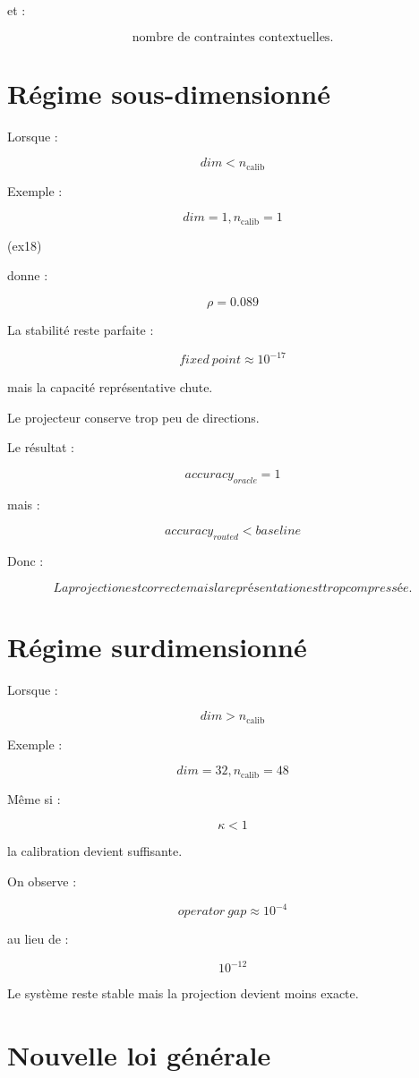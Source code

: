 \documentclass[11pt]{article}
\begin{document}
et :

\[
\text{nombre de contraintes contextuelles}.
\]


\section{Régime sous-dimensionné}


Lorsque :

\[
dim<n_{\mathrm{calib}}
\]


Exemple :

\[
dim=1,n_{\mathrm{calib}}=1
\]

(ex18)


donne :

\[
\rho=0.089
\]


La stabilité reste parfaite :

\[
fixed\ point\approx10^{-17}
\]


mais la capacité représentative chute.


Le projecteur conserve trop peu de directions.


Le résultat :

\[
accuracy_{oracle}=1
\]


mais :

\[
accuracy_{routed}<baseline
\]


Donc :

\[
\boxed{
La projection est correcte mais la représentation est trop compressée.
}
\]


\section{Régime surdimensionné}


Lorsque :

\[
dim>n_{\mathrm{calib}}
\]


Exemple :

\[
dim=32,n_{\mathrm{calib}}=48
\]


Même si :

\[
\kappa<1
\]


la calibration devient suffisante.


On observe :

\[
operator\ gap
\approx10^{-4}
\]


au lieu de :

\[
10^{-12}
\]


Le système reste stable mais la projection devient moins exacte.


\section{Nouvelle loi générale}
\end{document}
